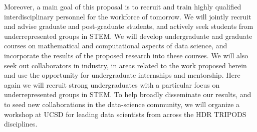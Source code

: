 \documentclass{article}
\begin{document}
Moreover, a main goal of this proposal is to recruit and train highly qualified interdisciplinary personnel for the workforce of tomorrow. We will jointly recruit and advise graduate and post-graduate students, and actively seek students from underrepresented groups in STEM. We will develop undergraduate and graduate courses on mathematical and computational aspects of data science, and incorporate the
results of the proposed research into these courses. We will also seek out collaborators in industry, in areas related to the work proposed herein and use the opportunity for undergraduate internships and mentorship. Here again we will recruit strong undergraduates with a particular focus on underrepresented groups in STEM.
To help broadly disseminate our results, and to seed new collaborations in the data-science community, we will organize a workshop at UCSD for leading data scientists from across the HDR TRIPODS disciplines. 
\end{document}
